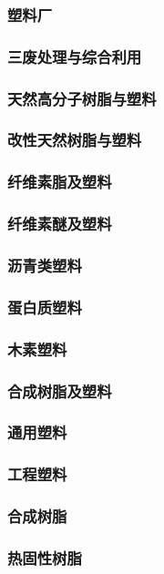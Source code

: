 \documentclass[UTF8]{../../ApplicationUniverse}
\begin{document}
    \subsubsection{塑料厂}
    \subsubsection{三废处理与综合利用}
\subsubsection{天然高分子树脂与塑料}
    \subsubsection{改性天然树脂与塑料}
        \subsubsection{纤维素脂及塑料}
        \subsubsection{纤维素醚及塑料}
    \subsubsection{沥青类塑料}
    \subsubsection{蛋白质塑料}
    \subsubsection{木素塑料}
\subsubsection{合成树脂及塑料}
    \subsubsection{通用塑料}
    \subsubsection{工程塑料}
    \subsubsection{合成树脂}
        \subsubsection{热固性树脂}
\end{document}

